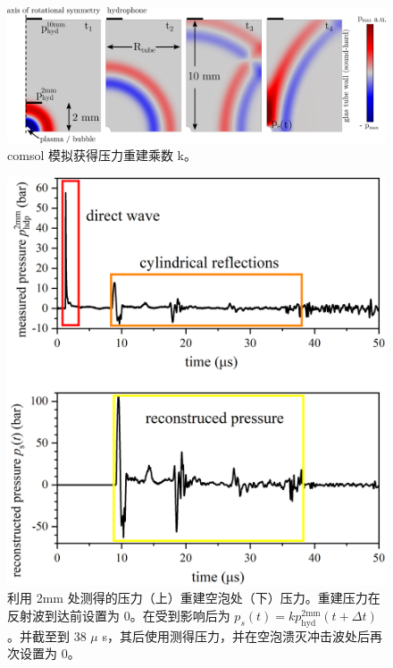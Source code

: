 \begin{figure}[H]
  \centering
  \includegraphics[width=1\linewidth]{img/fig5.6.png}
  \caption{comsol
模拟获得压力重建乘数 k。}
  \label{fig:5.6}
\end{figure}

\begin{figure}[H]
  \centering
  \includegraphics[width=0.6\linewidth]{img/fig5.7.png}
  \caption[利用 2mm
处测得的压力（上）重建空泡处（下）压力]{利用 2mm
处测得的压力（上）重建空泡处（下）压力。重建压力在反射波到达前设置为
0。在受到影响后为
$p_s (t)=k p_\mathrm{hyd}^\mathrm{2mm}(t+\Delta t)$。并截至到 38
$\mu$ s，其后使用测得压力，并在空泡溃灭冲击波处后再次设置为 0。}
  \label{fig:5.7}
\end{figure}

